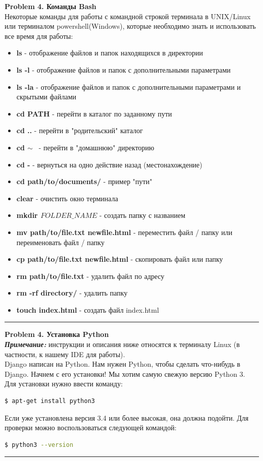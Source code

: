 \documentclass[a4paper, 11pt]{extarticle}
\newenvironment{problem}[2][Problem]
    { \begin{mdframed}[backgroundcolor=gray!20] \textbf{#1 #2} \\}
    {  \end{mdframed}}
\begin{document}
\begin{problem}{4. Команды Bash}
Некоторые команды для работы с командной строкой терминала в UNIX/Linux или терминалом powershell(Windows), которые необходимо знать и использовать все время для работы:
\begin{itemize}
\item \textbf{ls} - отображение файлов и папок находящихся в директории
\item \textbf{ls -l} - отображение файлов и папок с дополнительными параметрами
\item \textbf{ls -la} - отображение файлов и папок с дополнительными параметрами и скрытыми файлами
\item \textbf{cd PATH} - перейти в каталог по заданному пути 
\item \textbf{cd ..} - перейти в "родительский" каталог
\item \textbf{cd $\sim$} $\, $ - перейти в "домашнюю" директорию
\item \textbf{cd -} - вернуться на одно действие назад (местонахождение)
\item \textbf{cd path/to/documents/} - пример "пути"
\item \textbf{clear} - очистить окно терминала
\item \textbf{mkdir $FOLDER\_NAME$} - создать папку с названием
\item \textbf{mv path/to/file.txt newfile.html} - переместить файл / папку или переименовать файл / папку
\item \textbf{cp path/to/file.txt newfile.html} - скопировать файл или папку 
\item \textbf{rm path/to/file.txt} - удалить файл по адресу
\item \textbf{rm -rf directory/} - удалить папку
\item \textbf{touch index.html} - создать файл index.html
\end{itemize}
\end{problem}
\noindent\rule{6.257in}{2.8pt}

\begin{problem}{4. Установка Python}
\textit{\textbf{Примечание:}} инструкции и описания ниже относятся к терминалу Linux (в частности, к нашему IDE для работы).\\
Django написан на Python. Нам нужен Python, чтобы сделать что-нибудь в Django. Начнем с его установки! Мы хотим самую свежую версию Python 3. Для установки нужно ввести команду:
\begin{lstlisting}[language=Bash]
$ apt-get install python3
\end{lstlisting}
Если уже установлена версия 3.4 или более высокая, она должна подойти. Для проверки можно воспользоваться следующей командой:
\begin{lstlisting}[language=Bash]
$ python3 --version
\end{lstlisting}
\end{problem}
\noindent\rule{6.257in}{2.8pt}
\end{document}
